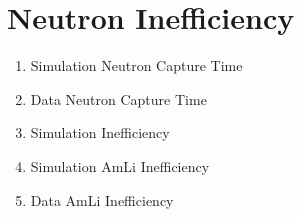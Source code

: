 \section{Neutron Inefficiency}




\begin{tcolorbox}[colback=red!5!white, colframe=red!50!black, title=Key Plots]
\begin{enumerate}
    \item Simulation Neutron Capture Time
    \item Data Neutron Capture Time
    \item Simulation Inefficiency
    \item Simulation AmLi Inefficiency
    \item Data AmLi Inefficiency
\end{enumerate}
\end{tcolorbox}